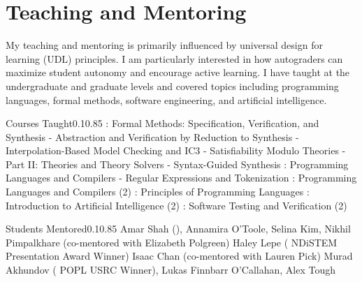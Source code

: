 \documentclass{federico_cv}
\begin{document}
\section{Teaching and Mentoring}

My teaching and mentoring is primarily influenced by universal design for
learning (UDL) principles. I am particularly interested in how autograders can
maximize student autonomy and encourage active learning. I have taught at
the undergraduate and graduate levels and covered topics including programming
languages, formal methods, software engineering, and artificial intelligence.


\begin{tblSubSection}{Courses Taught}{0.1}{0.85}
{: Formal Methods: Specification, Verification, and Synthesis}
{\quad - Abstraction and Verification by Reduction to Synthesis} 
{\quad - Interpolation-Based Model Checking and IC3}
{\quad - Satisfiability Modulo Theories - Part II: Theories and Theory Solvers}
{\quad - Syntax-Guided Synthesis} 
{: Programming Languages and Compilers}
{\quad - Regular Expressions and Tokenization}
{: Programming Languages and Compilers (2)}
{: Principles of Programming Languages} 
{: Introduction to Artificial Intelligence (2)}
{: Software Testing and Verification (2)}
\end{tblSubSection}

\begin{tblSubSection}{Students Mentored}{0.1}{0.85}
{Amar Shah (),
Annamira O'Toole, Selina Kim, Nikhil Pimpalkhare (co-mentored with Elizabeth Polgreen)}
{Haley Lepe
(
{NDiSTEM  Presentation Award Winner})}
{Isaac Chan (co-mentored with Lauren Pick)}
{Murad Akhundov
(
{POPL  USRC Winner}), Lukas Finnbarr O'Callahan, Alex Tough}
\end{tblSubSection}
\end{document}
